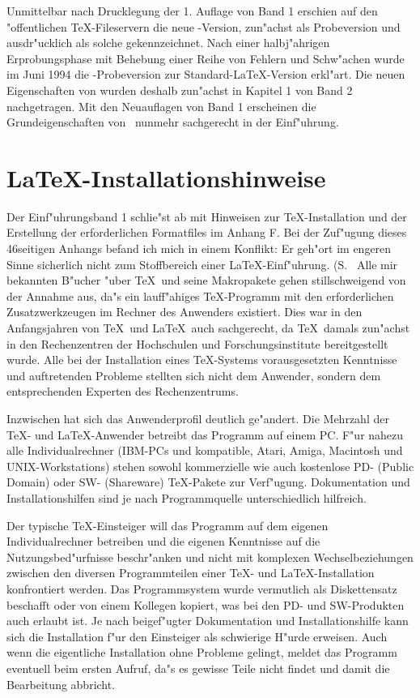 Unmittelbar nach Drucklegung der 1. Auflage von Band 1 erschien auf den
"offentlichen \TeX-Fileservern die neue \LaTeXe-Version, zun"achst als
Probeversion und ausdr"ucklich als solche gekennzeichnet. Nach einer
halbj"ahrigen Erprobungsphase mit Behebung einer Reihe von Fehlern und
Schw"achen wurde im Juni 1994 die \LaTeXe-Probeversion zur
Standard-\LaTeX-Version erkl"art. Die neuen Eigenschaften von \LaTeXe wurden
deshalb zun"achst in Kapitel 1 von Band 2 nachgetragen. Mit den Neuauflagen
von Band 1 erscheinen die Grundeigenschaften
von \LaTeXe\ nunmehr sachgerecht in der Einf"uhrung. 

\section{\LaTeX-Installationshinweise}
Der Einf"uhrungsband 1 schlie"st ab mit Hinweisen zur \TeX-Installation und der
Erstellung der erforderlichen Formatfiles im Anhang F. 
Bei der Zuf"ugung dieses 46seitigen Anhangs befand ich mich in einem Konflikt:
Er geh"ort im engeren Sinne sicherlich nicht zum Stoffbereich einer 
\LaTeX-Einf"uhrung. (S.~\cite[Anh. F]{hk1}
Alle mir bekannten B"ucher "uber \TeX\ und seine Makropakete gehen
stillschweigend von der Annahme aus, da"s ein lauff"ahiges \TeX-Programm
mit den erforderlichen Zusatzwerkzeugen im Rechner des Anwenders existiert.
Dies war in den Anfangsjahren von \TeX\ und \LaTeX\ auch sachgerecht, da
\TeX\ damals zun"achst in den Rechenzentren der Hochschulen und 
Forschungsinstitute bereitgestellt wurde. Alle bei der Installation eines
\TeX-Systems vorausgesetzten Kenntnisse und auftretenden Probleme stellten
sich nicht dem Anwender, sondern dem entsprechenden Experten des
Rechenzentrums.

Inzwischen hat sich das Anwenderprofil deutlich ge"andert. Die Mehrzahl
der \TeX- und \LaTeX-Anwender betreibt das Programm auf einem PC. 
F"ur nahezu alle Individualrechner (IBM-PCs und kompatible, Atari, Amiga,
Macintosh und UNIX-Workstations) stehen sowohl kommerzielle wie auch
kostenlose PD- (Public Domain) oder SW- (Shareware) \TeX-Pakete zur 
Verf"ugung. Dokumentation und Installationshilfen sind je nach Programmquelle
unterschiedlich hilfreich. 

Der typische \TeX-Einsteiger will das Programm auf dem eigenen 
Individualrechner betreiben und die eigenen Kenntnisse auf die 
Nutzungsbed"urfnisse beschr"anken und nicht mit komplexen Wechselbeziehungen
zwischen den diversen Programmteilen einer \TeX- und \LaTeX-Installation
konfrontiert werden. Das Programmsystem wurde vermutlich als Diskettensatz
beschafft oder von einem Kollegen kopiert, was bei den PD- und SW-Produkten
auch erlaubt ist. Je nach beigef"ugter Dokumentation und Installationshilfe
kann sich die Installation f"ur den Einsteiger als schwierige H"urde erweisen.
Auch wenn die eigentliche Installation ohne Probleme gelingt, meldet das
Programm eventuell beim ersten Aufruf, da"s es gewisse Teile nicht findet und
damit die Bearbeitung abbricht.          

